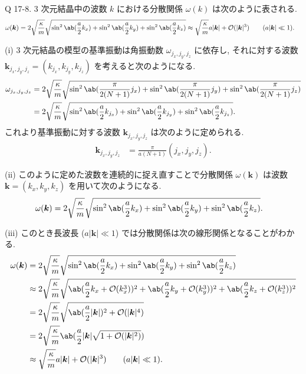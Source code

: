 \documentclass[uplatex,diffipdfmx,a4paper,11pt]{jlreq}
\theoremstyle{definition}
\begin{document}
\begin{itembox}[l]{Q 17-8.}
  3 次元結晶中の波数 $k$ における分散関係 $\omega(k)$ は次のように表される.
  \begin{align}
    \omega(\bm{k}) & = 2\sqrt{\frac{\kappa}{m}}\sqrt{\sin^2\ab(\frac{a}{2}k_x) + \sin^2\ab(\frac{a}{2}k_y) + \sin^2\ab(\frac{a}{2}k_z)} \approx \sqrt{\frac{\kappa}{m}}a|\bm{k}| + \mathcal{O}(|\bm{k}|^3) \qquad (a|\bm{k}| \ll 1).
  \end{align}
\end{itembox}

(i) 3 次元結晶の模型の基準振動は角振動数 $\omega_{j_x,j_y,j_z}$ に依存し, それに対する波数 $\bm{k}_{j_x,j_y,j_z} = (k_{j_x}, k_{j_y}, k_{j_z})$ を考えると次のようになる.
\begin{align}
  \omega_{j_x,j_y,j_z} & = 2\sqrt{\frac{\kappa}{m}}\sqrt{\sin^2\ab(\frac{\pi}{2(N+1)}j_x) + \sin^2\ab(\frac{\pi}{2(N+1)}j_y) + \sin^2\ab(\frac{\pi}{2(N+1)}j_z)} \\
                       & = 2\sqrt{\frac{\kappa}{m}}\sqrt{\sin^2\ab(\frac{a}{2}k_{j_x}) + \sin^2\ab(\frac{a}{2}k_{j_y}) + \sin^2\ab(\frac{a}{2}k_{j_z})}.
\end{align}
これより基準振動に対する波数 $\bm{k}_{j_x,j_y,j_z}$ は次のように定められる.
\begin{align}
  \bm{k}_{j_x,j_y,j_z} & = \frac{\pi}{a(N+1)}(j_x,j_y,j_z).
\end{align}

(ii) このように定めた波数を連続的に捉え直すことで分散関係 $\omega(\bm{k})$ は波数 $\bm{k} = (k_x, k_y, k_z)$ を用いて次のようになる.
\begin{align}
  \omega(\bm{k}) & = 2\sqrt{\frac{\kappa}{m}}\sqrt{\sin^2\ab(\frac{a}{2}k_x) + \sin^2\ab(\frac{a}{2}k_y) + \sin^2\ab(\frac{a}{2}k_z)}.
\end{align}

(iii) このとき長波長 ($a|\bm{k}| \ll 1$) では分散関係は次の線形関係となることがわかる.
\begin{align}
  \omega(\bm{k}) & = 2\sqrt{\frac{\kappa}{m}}\sqrt{\sin^2\ab(\frac{a}{2}k_x) + \sin^2\ab(\frac{a}{2}k_y) + \sin^2\ab(\frac{a}{2}k_z)}                                                          \\
                 & \approx 2\sqrt{\frac{\kappa}{m}}\sqrt{\ab(\frac{a}{2}k_x + \mathcal{O}(k_x^3))^2 + \ab(\frac{a}{2}k_y + \mathcal{O}(k_y^3))^2 + \ab(\frac{a}{2}k_z + \mathcal{O}(k_z^3))^2} \\
                 & = 2\sqrt{\frac{\kappa}{m}}\sqrt{\ab(\frac{a}{2}|\bm{k}|)^2 + \mathcal{O}(|\bm{k}|^4)}                                                                                       \\
                 & = 2\sqrt{\frac{\kappa}{m}}\ab(\frac{a}{2}|\bm{k}|\sqrt{1 + \mathcal{O}(|\bm{k}|^2)})                                                                                        \\
                 & \approx \sqrt{\frac{\kappa}{m}}a|\bm{k}| + \mathcal{O}(|\bm{k}|^3) \qquad (a|\bm{k}| \ll 1).
\end{align}
\end{document}
